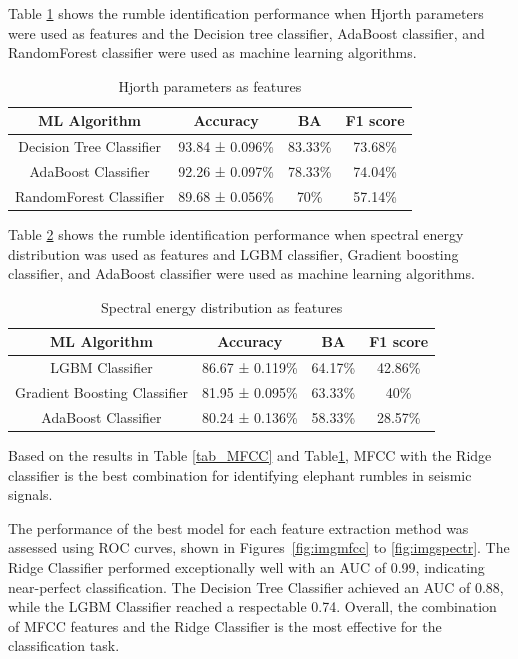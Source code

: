\documentclass[applsci,article,accept,moreauthors,pdftex]{Definitions/mdpi}
\begin{document}
Table \ref{tab_Hj} shows the rumble identification performance when Hjorth parameters were used as features and the Decision tree classifier, AdaBoost classifier, and RandomForest classifier were used as machine learning algorithms. 
\begin{table}[h]
	\centering
	\begin{tabular}{|c|c|c|c|}
		\hline
		\textbf{ML Algorithm} & \textbf{Accuracy} & \textbf{BA} & \textbf{F1 score} \\
		\hline
		Decision Tree Classifier & 93.84 ± 0.096\% & 83.33\% & 73.68\% \\
		\hline
		AdaBoost Classifier & 92.26 ± 0.097\% & 78.33\% & 74.04\% \\
		\hline
		RandomForest Classifier & 89.68  ± 0.056\% & 70\% & 57.14\% \\
		\hline
	\end{tabular}
	\caption{Hjorth parameters as features}
	\label{tab_Hj}
\end{table}
Table \ref{tab_SED} shows the rumble identification performance when spectral energy distribution was used as features and LGBM classifier, Gradient boosting classifier, and AdaBoost classifier were used as machine learning algorithms. 
\begin{table}[H]
	\centering
	\begin{tabular}{|c|c|c|c|}
		\hline
		\textbf{ML Algorithm} & \textbf{Accuracy} & \textbf{BA} & \textbf{F1 score} \\
		\hline
		LGBM Classifier & 86.67 ± 0.119\% & 64.17\% & 42.86\% \\
		\hline
		Gradient Boosting Classifier & 81.95 ± 0.095\% & 63.33\% & 40\% \\
		\hline
		AdaBoost Classifier & 80.24  ± 0.136\% & 58.33\% & 28.57\% \\
		\hline
	\end{tabular}
	\caption{Spectral energy distribution as features}
	\label{tab_SED}
\end{table}
Based on the results in Table \ref{tab_MFCC} and Table\ref{tab_Hj}, MFCC with the Ridge classifier is the best combination for identifying elephant rumbles in seismic signals.

The performance of the best model for each feature extraction method was assessed using ROC curves, shown in Figures~\ref{fig:imgmfcc} to \ref{fig:imgspectr}. The Ridge Classifier performed exceptionally well with an AUC of 0.99, indicating near-perfect classification. The Decision Tree Classifier achieved an AUC of 0.88, while the LGBM Classifier reached a respectable 0.74. Overall, the combination of MFCC features and the Ridge Classifier is the most effective for the classification task.
\end{document}
